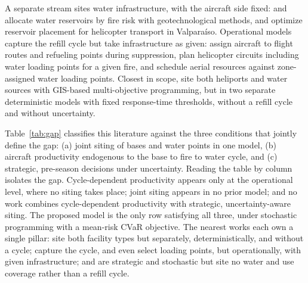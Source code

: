 \documentclass[11pt]{article}
\begin{document}
A separate stream sites water infrastructure, with the aircraft side
fixed: \citet{ramalho2021} and \citet{ramalho2024} allocate water
reservoirs by fire risk with geotechnological methods, and
\citet{alfaro2024} optimize reservoir placement for helicopter
transport in Valpara{\'i}so. Operational models capture the refill
cycle but take infrastructure as given: \citet{rodriguezveiga2018}
assign aircraft to flight routes and refueling points during
suppression, \citet{rodriguezbarreiro2026} plan helicopter circuits
including water loading points for a given fire, and
\citet{skorinkapov2024} schedule aerial resources against zone-assigned
water loading points. Closest in scope, \citet{maras2023} site both
heliports and water sources with GIS-based multi-objective programming,
but in two separate deterministic models with fixed response-time
thresholds, without a refill cycle and without uncertainty.

Table~\ref{tab:gap} classifies this literature against the three
conditions that jointly define the gap: (a) joint siting of bases and
water points in one model, (b) aircraft productivity endogenous to the
base to fire to water cycle, and (c) strategic, pre-season decisions
under uncertainty. Reading the table by column isolates the gap.
Cycle-dependent productivity appears only at the operational level,
where no siting takes place; joint siting appears in no prior model;
and no work combines cycle-dependent productivity with strategic,
uncertainty-aware siting. The proposed model is the only row satisfying
all three, under stochastic programming with a mean-risk CVaR
objective. The nearest works each own a single pillar:
\citet{maras2023} site both facility types but separately,
deterministically, and without a cycle; \citet{rodriguezbarreiro2026}
capture the cycle, and even select loading points, but operationally,
with given infrastructure; and \citet{wei2015} are strategic and
stochastic but site no water and use coverage rather than a refill
cycle.
\end{document}
